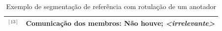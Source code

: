 \begin{table}[!h]
\begin{tabular}{|p{0.2cm}p{}|}
$^{[13]}$ &
	Comunicação dos membros: Não houve;
	\textit{<irrelevante>} 
\\ \hline










	\end{tabular}
	\caption{Exemplo de segmentação de referência com rotulação de um anotador}
	\label{tab:segmentacaoreferencia}
\end{table}








  




